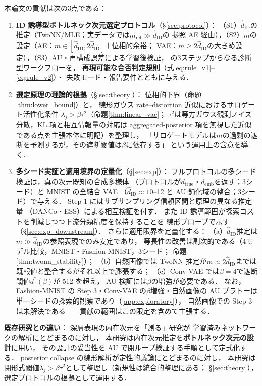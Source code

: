 \documentclass[11pt,a4paper]{jsarticle}
\newcommand{\hatdID}{\hat{d}_{\mathrm{ID}}}
\newcommand{\dtrue}{d_{\mathrm{true}}}
\newcommand{\demb}{d_{\mathrm{emb}}}
\newcommand{\dstar}{d^{*}(\beta)}
\begin{document}
本論文の貢献は次の3点である：
\begin{enumerate}
  \item \textbf{ID 誘導型ボトルネック次元選定プロトコル}（§\ref{sec:protocol}）：
        （S1）$\hatdID$の推定（TwoNN/MLE；実データでは$m_{\mathrm{ref}} \gg \hatdID$の
        参照 AE 経由），（S2）$m$の設定（AE：$m \in [\hatdID, 2\hatdID]$＋位相的余裕；
        VAE：$m \geq 2\hatdID$の大きめ設定），（S3）AU・再構成誤差による学習後検証，
        の3ステップからなる診断型ワークフローを，
        \textbf{再現可能な合否判定規則}（式\eqref{eq:rule_v1}--\eqref{eq:rule_v2}）・
        失敗モード・報告要件とともに与える．
  \item \textbf{選定原理の理論的根拠}（§\ref{sec:theory}）：
        位相的下界（命題\ref{thm:lower_bound}）と，
        線形ガウス rate--distortion 近似におけるサロゲート活性化条件
        $\lambda_j > \beta\tau^2$（命題\ref{thm:linear_vae}；
        $\tau^2$は等方ガウス観測ノイズ分散，KL 項と相互情報量の対応は
        aggregated-posterior 項を無視した近似である点を主張本体に明記）を整理し，
        「サロゲートモデルは$m$の過剰の遮断を予測するが，その遮断閾値は$\beta$に依存する」
        という運用上の含意を導く．
  \item \textbf{多シード実証と適用境界の定量化}（§\ref{sec:exp}）：
        フルプロトコルの多シード検証は，真の次元既知の合成多様体
        （プロトコルが$\dtrue$・$\demb$を返す；3シード）と MNIST の全結合 VAE
        （$\hatdID \approx 10$--12 と AU 鈍化域の整合；3シード）で与える．
        Step 1 にはサブサンプリング信頼区間と原理の異なる推定量
        （DANCo・ESS）による相互検証を付す．
        また ID 誘導範囲が探索コストを削減しつつ下流分類精度を保持することを
        線形プローブで示す（§\ref{sec:exp_downstream}）．
        さらに適用限界を定量化する：
        （a）$\hatdID$推定は$m \gg \hatdID$の参照表現でのみ安定であり，
        等長性の改善は副次的である（4モデル比較，MNIST・Fashion-MNIST，3シード；
        命題\ref{thm:twonn_stability}）；
        （b）自然画像では TwoNN 推定が$m \approx 2\hatdID$までは
        既報値\cite{pope2021intrinsic}と整合するがそれ以上で膨張する；
        （c）Conv-VAE では$\beta = 4$で遮断閾値$\dstar$が 512 を超え，
        AU 検証には$\beta$の増強が必要である．
        なお，Fashion-MNIST の Step 3・Conv-VAE の$\beta$増強・自然画像の
        AU プラトーは単一シードの探索的観察であり（\ref{app:exploratory}），
        自然画像での Step 3 は未解決である——貢献の範囲はこの限定を含めて主張する．
\end{enumerate}

\textbf{既存研究との違い}：
深層表現の内在次元を「測る」研究\cite{ansuini2019intrinsic,pope2021intrinsic,valeriani2023geometry}が
学習済みネットワークの解析にとどまるのに対し，
本研究は内在次元推定を\textbf{ボトルネック次元の設計}に用い，
その設計の妥当性を AU で閉ループ検証する手順として定式化する．
posterior collapse の線形解析\cite{lucas2019elbo}が定性的議論にとどまるのに対し，
本研究は閉形式閾値$\lambda_j > \beta\tau^2$として整理し（新規性は統合的整理にある；
§\ref{sec:theory}），選定プロトコルの根拠として運用する．
\end{document}
